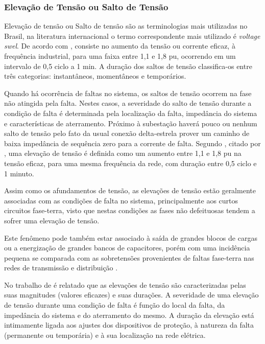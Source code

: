 \subsubsection{Elevação de Tensão ou Salto de Tensão}
\par
Elevação de tensão ou Salto de tensão são as terminologias mais utilizadas no Brasil, na literatura internacional o termo correspondente mais utilizado é \textit{voltage swel}. De acordo com \cite{FER99}, consiste no aumento da tensão ou corrente eficaz, à frequência industrial, para uma faixa entre 1,1 e 1,8 pu, ocorrendo em um intervalo de 0,5 ciclo a 1 min. A duração dos saltos de tensão classifica-os entre três categorias: instantâneos, momentâneos e temporários.
\par
Quando há ocorrência de faltas no sistema, os saltos de tensão ocorrem na fase não atingida pela falta. Nestes casos, a severidade do salto de tensão durante a condição de falta é determinada pela localização da falta, impedância do sistema e características de aterramento. Próximo à subestação haverá pouco ou nenhum salto de tensão pelo fato da usual conexão delta-estrela prover um caminho de baixa impedância de sequência zero para a corrente de falta. Segundo \cite{OLIVE}, citado por \cite{DEL03}, uma elevação de tensão é definida como um aumento entre 1,1 e 1,8 pu na tensão eficaz, para uma mesma frequência da rede, com duração entre 0,5 ciclo e 1 minuto.
\par
Assim como os afundamentos de tensão, as elevações de tensão estão geralmente associadas com as condições de falta no sistema, principalmente aos curtos circuitos fase-terra, visto que nestas condições as fases não defeituosas tendem a sofrer uma elevação de tensão.
\par
Este fenômeno pode também estar associado à saída de grandes blocos de cargas ou a energização de grandes bancos de capacitores, porém com uma incidência pequena se comparada com as sobretensões provenientes de faltas fase-terra nas redes de transmissão e distribuição \cite{DUG96}.
\par
No trabalho de \cite{DEL03} é relatado que as elevações de tensão são caracterizadas pelas suas magnitudes (valores eficazes) e suas durações. A severidade de uma elevação de tensão durante uma condição de falta é função do local da falta, da impedância do sistema e do aterramento do mesmo. A duração da elevação está intimamente ligada aos ajustes dos dispositivos de proteção, à natureza da falta (permanente ou temporária) e à sua localização na rede elétrica.
\par
